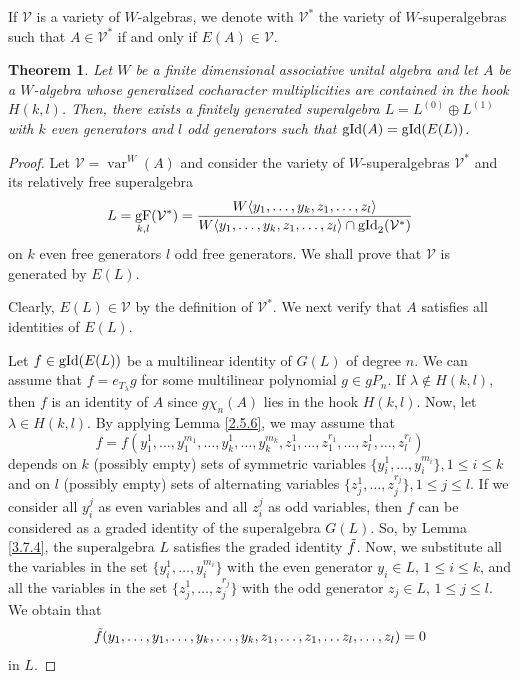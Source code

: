 \documentclass{article}
\newtheorem{theorem}{Theorem}[section]
\newcommand{\cV}{\mathcal{V}}
\DeclareMathOperator{\gid}{\textnormal{gId}}
\DeclareMathOperator{\var}{var}
\DeclareMathOperator{\F}{gF}
\begin{document}
If $\cV$ is a variety of $W$-algebras, we denote with $\cV^*$ the variety of $W$-superalgebras such that $A\in\cV^*$ if and only if $E(A)\in \cV$.

\begin{theorem}
\label{th: Grassmann envelope}
    Let $W$ be a finite dimensional associative unital algebra and let $A$ be a $W$-algebra whose generalized cocharacter multiplicities are contained in the hook $H(k,l)$. Then, there exists a finitely generated superalgebra $L=L^{(0)} \oplus L^{(1)}$ with $k$ even generators and $l$ odd generators such that $\gid(A)=\gid(E(L))$.
\end{theorem}
\begin{proof}
    Let $\cV=\var^W(A)$ and consider the variety of $W$-superalgebras $\mathcal{V}^*$ and its relatively free superalgebra 
    \[ L = \F_{k,l}(\cV^*)=\frac{W\langle y_1,\dots,y_k,z_1,\dots,z_l\rangle}{W\langle y_1,\dots,y_k,z_1,\dots,z_l\rangle\cap \gid_2(\cV^*)} \]
    on $k$ even free generators $l$ odd free generators. We shall prove that $\mathcal{V}$ is generated by $E(L)$.

    Clearly, $E(L) \in \mathcal{V}$ by the definition of $\mathcal{V}^*$. We next verify that $A$ satisfies all identities of $E(L)$.

    Let $f \in \gid(E(L))$ be a multilinear identity of $G(L)$ of degree $n$. We can assume that $f=e_{T_\lambda}g$ for some multilinear polynomial $g\in gP_n$. If $\lambda \notin H(k,l)$, then $f$ is an identity of $A$ since $g\chi_n(A)$ lies in the hook $H(k,l)$. Now, let $\lambda \in H(k,l)$. By applying Lemma \ref{2.5.6}, we may assume that
    \[
    f=f(y_1^1,\ldots,y_1^{m_1},\ldots,y_k^1,\ldots,y_k^{m_k},z_1^1,\ldots,z_1^{r_1},\ldots,z_l^1,\ldots,z_l^{r_l})
    \]
    depends on $k$ (possibly empty) sets of symmetric variables $\{ y_i^1,\ldots,y_i^{m_i} \}, 1 \le i \le k$ and on $l$ (possibly empty) sets of alternating variables $\{z_j^1,\ldots,z_j^{r_j}\}, 1 \le j \le l$. If we consider all $y_i^j$ as even variables and all $z_i^j$ as odd variables, then $f$ can be considered as a graded identity of the superalgebra $G(L)$. So, by Lemma \ref{3.7.4}, the superalgebra $L$ satisfies the graded identity $\Tilde{f}$. Now, we substitute all the variables in the set $\{ y_i^1,\ldots,y_i^{m_i} \}$ with the even generator $y_i\in L$, $1 \le i \le k$, and all the variables in the set $\{z_j^1,\ldots,z_j^{r_j}\}$ with the odd generator $z_j\in L$, $1 \le j \le l$. We obtain that \begin{equation} \label{eq: f=0 in L}
        \Tilde{f}(y_1,\ldots,y_1,\ldots,y_k,\ldots,y_k,z_1,\ldots,z_1,\ldots z_l,\ldots, z_l) = 0
    \end{equation}
    in $L$.


\end{proof}
\end{document}
